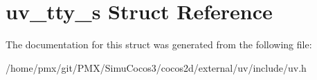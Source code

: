 \hypertarget{structuv__tty__s}{}\section{uv\+\_\+tty\+\_\+s Struct Reference}
\label{structuv__tty__s}


The documentation for this struct was generated from the following file\+:\begin{DoxyCompactItemize}
\item 
/home/pmx/git/\+P\+M\+X/\+Simu\+Cocos3/cocos2d/external/uv/include/uv.\+h\end{DoxyCompactItemize}
